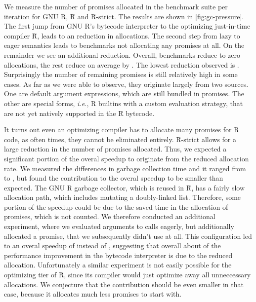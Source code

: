 \documentclass[review,nonacm,screen,acmsmall,anonymous=true]{acmart}
\newcommand{\authorcomment}[3]{}
\newcommand{\OF}[1]{\authorcomment{magenta}{OF}{#1}}
\renewcommand{\Rsh}{{\sf\u R}\xspace}
\newcommand{\Rshstrict}{{\sf\u R-strict}\xspace}
\newcommand{\ie}{\emph{i.e.},\xspace}
\begin{document}
We measure the number of promises allocated in the
benchmark suite per iteration for GNU R, \Rsh and \Rsh-strict. The results are shown in
\autoref{fig:gc-pressure}. The first jump from GNU R's bytecode interpreter to
the optimizing just-in-time compiler \Rsh, leads to an \promiseAlocationReductionGnurRsh
reduction in allocations. The second step
from lazy to eager semantics leads to \promiseAlocationReductionRshStrictToZero
benchmarks not allocating any promises at all. On the remainder we see an additional
\promiseAlocationReductionRshStrict reduction.
Overall, \promiseAlocationReductionRshStrictToZero benchmarks reduce to zero
allocations, the rest reduce on average by \promiseAlocationReductionGnurRshStrict.
The lowest reduction observed is
\promiseAlocationReductionGnurRshStrictMin.
Surprisingly the number of remaining promises is
still relatively high in some cases. As far as we were able to observe, they
originate largely from two sources. One are default argument expressions, which
are still bundled in promises. \OF{which bms and how much?} The other are special forms,
\ie R builtins with a custom evaluation
strategy, that are not yet natively supported in the \Rsh bytecode.

It turns out even an optimizing compiler has to allocate many promises for R
code, as often times, they cannot be eliminated entirely. \Rshstrict allows for
a large reduction in the number of promises allocated.
Thus, we expected a significant portion of the overal speedup to originate from
the reduced allocation rate. We measured the differences in garbage collection
time and it ranged from \speedupGCRshStrictMin to \speedupGCRshStrictMax, but
found the contribution to the overal speedup to be smaller than expected.
The GNU R garbage collector, which is reused in \Rsh, has a fairly slow allocation path, which
includes mutating a doubly-linked list. Therefore, some portion of the speedup
could be due to the saved time in the allocation of promises, which is not counted.
We therefore conducted an additional experiment, where we evaluated arguments to
calls eagerly, but additionally allocated a promise, that we subsequently didn't
use at all. This configuration led to an overal speedup of
\speedupBCRshStrictAlloc instead of \speedupBCRshStrict, suggesting that overall
about \speedupDueToReducedGC of the performance improvement in the bytecode interpreter is due to the
reduced allocation. Unfortunately a similar experiment is not easily possible
for the optimizing tier of \Rsh, since its compiler would just optimize away all
unneccessary allocations. We conjecture that the contribution should be even
smaller in that case, because it allocates much less promises to start with.
\end{document}
